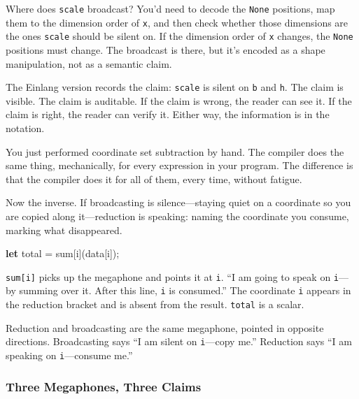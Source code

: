 \documentclass[11pt,titlepage]{article}
\newenvironment{Shaded}{}{}
\newcommand{\KeywordTok}[1]{\textcolor[rgb]{0.00,0.44,0.13}{\textbf{#1}}}
\newcommand{\NormalTok}[1]{#1}
\newcommand{\OperatorTok}[1]{\textcolor[rgb]{0.40,0.40,0.40}{#1}}
\begin{document}
Where does \texttt{scale} broadcast? You'd need to decode the
\texttt{None} positions, map them to the dimension order of \texttt{x},
and then check whether those dimensions are the ones \texttt{scale}
should be silent on. If the dimension order of \texttt{x} changes, the
\texttt{None} positions must change. The broadcast is there, but it's
encoded as a shape manipulation, not as a semantic claim.

The Einlang version records the claim: \texttt{scale} is silent on
\texttt{b} and \texttt{h}. The claim is visible. The claim is auditable.
If the claim is wrong, the reader can see it. If the claim is right, the
reader can verify it. Either way, the information is in the notation.

You just performed coordinate set subtraction by hand. The compiler does
the same thing, mechanically, for every expression in your program. The
difference is that the compiler does it for all of them, every time,
without fatigue.

\vspace{2em}

Now the inverse. If broadcasting is silence---staying quiet on a
coordinate so you are copied along it---reduction is speaking: naming
the coordinate you consume, marking what disappeared.

\begin{Shaded}
\begin{Highlighting}[]
\KeywordTok{let}\NormalTok{ total = sum}\OperatorTok{[}\NormalTok{i}\OperatorTok{]}\NormalTok{(data}\OperatorTok{[}\NormalTok{i}\OperatorTok{]}\NormalTok{);}
\end{Highlighting}
\end{Shaded}

\texttt{sum{[}i{]}} picks up the megaphone and points it at \texttt{i}.
``I am going to speak on \texttt{i}---by summing over it. After this
line, \texttt{i} is consumed.'' The coordinate \texttt{i} appears in the
reduction bracket and is absent from the result. \texttt{total} is a
scalar.

Reduction and broadcasting are the same megaphone, pointed in opposite
directions. Broadcasting says ``I am silent on \texttt{i}---copy me.''
Reduction says ``I am speaking on \texttt{i}---consume me.''

\vspace{2em}

\hypertarget{three-megaphones-three-claims}{%
\subsubsection{Three Megaphones, Three
Claims}\label{three-megaphones-three-claims}}
\end{document}
